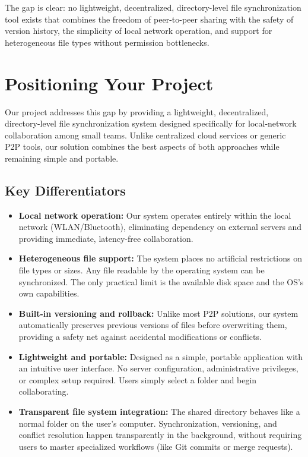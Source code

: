 \documentclass[11pt,oneside]{article}
\begin{document}
The gap is clear: no lightweight, decentralized, directory-level file synchronization tool exists that combines the freedom of peer-to-peer sharing with the safety of version history, the simplicity of local network operation, and support for heterogeneous file types without permission bottlenecks.

\section{Positioning Your Project}

Our project addresses this gap by providing a lightweight, decentralized, directory-level file synchronization system designed specifically for local-network collaboration among small teams. Unlike centralized cloud services or generic P2P tools, our solution combines the best aspects of both approaches while remaining simple and portable.

\subsection{Key Differentiators}

\begin{itemize}
    \item \textbf{Local network operation:} Our system operates entirely within the local network (WLAN/Bluetooth), eliminating dependency on external servers and providing immediate, latency-free collaboration.
    \item \textbf{Heterogeneous file support:} The system places no artificial restrictions on file types or sizes. Any file readable by the operating system can be synchronized. The only practical limit is the available disk space and the OS's own capabilities.
    \item \textbf{Built-in versioning and rollback:} Unlike most P2P solutions, our system automatically preserves previous versions of files before overwriting them, providing a safety net against accidental modifications or conflicts.
    \item \textbf{Lightweight and portable:} Designed as a simple, portable application with an intuitive user interface. No server configuration, administrative privileges, or complex setup required. Users simply select a folder and begin collaborating.
    \item \textbf{Transparent file system integration:} The shared directory behaves like a normal folder on the user's computer. Synchronization, versioning, and conflict resolution happen transparently in the background, without requiring users to master specialized workflows (like Git commits or merge requests).
\end{itemize}
\end{document}
